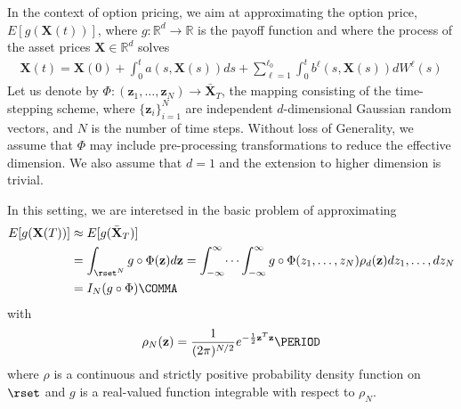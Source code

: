 In the context of option pricing, we aim at approximating the option price, $E[g(\mathbf{X}(t))]$,  where $g:\mathbb{R}^d  \rightarrow \mathbb{R}$ is the payoff function  and where  the process of the asset prices $\mathbf{X} \in \mathbb{R}^d$ solves 
\begin{align*}
	\mathbf{X}(t)=\mathbf{X}(0)+ \int_{0}^{t} a(s,\mathbf{X}(s)) ds + \sum_{\ell=1}^{\ell_0} \int_{0}^{t} b^{\ell}(s,\mathbf{X}(s)) dW^{\ell}(s)
\end{align*}
Let us denote  by $\Phi: (\mathbf{z}_1,\dots,\mathbf{z}_N) \rightarrow \bar{\mathbf{X}}_T$, the mapping consisting of the time-stepping scheme, where $\{\mathbf{z}_i\}_{i=1}^N$ are independent $d$-dimensional Gaussian random vectors, and $N$ is the number of time steps. Without loss of Generality, we assume that $\Phi$ may include pre-processing transformations to reduce the effective dimension. We also assume that $d=1$ and the extension to higher dimension is trivial.

In this setting, we are interetsed in the basic problem of approximating
\begin{align}\label{eq:multivariate integral}
E[g(\mathbf{X}(T))] &\approx E[g(\bar{\mathbf{X}}_T)] \nonumber\\
&=\int_{\rset^N}g \circ \Phi(\mathbf{z})	d \mathbf{z}= \int_{-\infty}^{\infty} \dots \int_{-\infty}^{\infty} g \circ \Phi(z_1,\dots,z_N) \rho_d(\mathbf{z}) dz_1,\dots,dz_N \nonumber\\
&=I_N (g \circ \Phi) \COMMA
\end{align}
with
\begin{equation*}\label{eq: multivariate gaussian distribution}
\rho_N(\mathbf{z})=\frac{1}{(2 \pi)^{N/2}} e^{-\frac{1}{2} \mathbf{z}^T \mathbf{z}} \PERIOD
\end{equation*} 
where $\rho$ is a continuous and strictly positive probability density function on $\rset$ and $g$ is a real-valued function integrable with respect to $\rho_N$.
 
